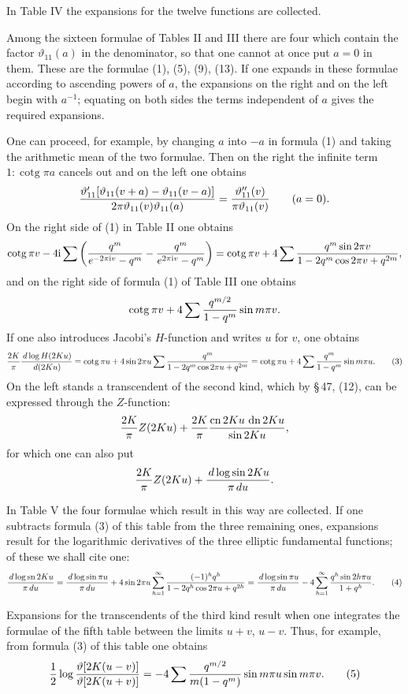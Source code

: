 \documentclass[11pt]{article}
\providecommand{\dd}{\,d}
\providecommand{\tht}{\vartheta}
\providecommand{\sn}{\operatorname{sn}}
\providecommand{\cn}{\operatorname{cn}}
\providecommand{\dn}{\operatorname{dn}}
\providecommand{\ctg}{\operatorname{cotg}}
\providecommand{\ii}{\mathrm{i}}
\begin{document}
In Table IV the expansions for the twelve functions are collected.

Among the sixteen formulae of Tables II and III there are four which contain the factor $\vartheta_{11}(a)$ in the denominator, so that one cannot at once put $a=0$ in them. These are the formulae (1), (5), (9), (13). If one expands in these formulae according to ascending powers of $a$, the expansions on the right and on the left begin with $a^{-1}$; equating on both sides the terms independent of $a$ gives the required expansions.

One can proceed, for example, by changing $a$ into $-a$ in formula (1) and taking the arithmetic mean of the two formulae. Then on the right the infinite term $1:\ctg\pi a$ cancels out and on the left one obtains
\[
{\tht'_{11}[\tht_{11}(v+a)-\tht_{11}(v-a)]\over2\pi\tht_{11}(v)\tht_{11}(a)}
={\tht''_{11}(v)\over\pi\tht_{11}(v)}\qquad(a=0).
\]
On the right side of (1) in Table II one obtains
\[
\ctg\pi v-4\ii\sum\left({q^m\over e^{-2\pi\ii v}-q^m}-{q^m\over e^{2\pi\ii v}-q^m}\right)
=\ctg\pi v+4\sum {q^m\sin2\pi v\over1-2q^m\cos2\pi v+q^{2m}},
\]
and on the right side of formula (1) of Table III one obtains
\[
\ctg\pi v+4\sum {q^{m/2}\over1-q^m}\sin m\pi v.
\]
If one also introduces Jacobi's $H$-function and writes $u$ for $v$, one obtains
\begin{equation}
{2K\over\pi}{\dd\log H(2Ku)\over\dd(2Ku)}
=\ctg\pi u+4\sin2\pi u\sum {q^m\over1-2q^m\cos2\pi u+q^{2m}}
=\ctg\pi u+4\sum {q^m\over1-q^m}\sin m\pi u.
\tag{3}
\end{equation}
On the left stands a transcendent of the second kind, which by \S\,47, (12), can be expressed through the $Z$-function:
\[
{2K\over\pi}Z(2Ku)+{2K\over\pi}{\cn2Ku\,\dn2Ku\over\sin2Ku},
\]
for which one can also put
\[
{2K\over\pi}Z(2Ku)+{\dd\log\sin2Ku\over\pi\dd u}.
\]

In Table V the four formulae which result in this way are collected. If one subtracts formula (3) of this table from the three remaining ones, expansions result for the logarithmic derivatives of the three elliptic fundamental functions; of these we shall cite one:
\begin{equation}
{\dd\log\sn2Ku\over\pi\dd u}
={\dd\log\sin\pi u\over\pi\dd u}
+4\sin2\pi u\sum_{h=1}^{\infty}{(-1)^h q^h\over1-2q^h\cos2\pi u+q^{2h}}
={\dd\log\sin\pi u\over\pi\dd u}-4\sum_{h=1}^{\infty}{q^h\sin2h\pi u\over1+q^h}.
\tag{4}
\end{equation}

Expansions for the transcendents of the third kind result when one integrates the formulae of the fifth table between the limits $u+v$, $u-v$. Thus, for example, from formula (3) of this table one obtains
\begin{equation}
{1\over2}\log{\vartheta[2K(u-v)]\over\vartheta[2K(u+v)]}
=-4\sum {q^{m/2}\over m(1-q^m)}\sin m\pi u\sin m\pi v.
\tag{5}
\end{equation}
\end{document}
